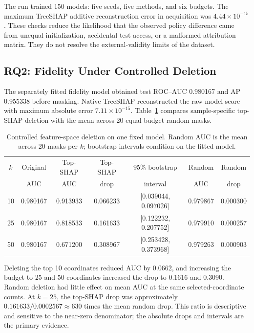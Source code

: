 The run trained 150 models: five seeds, five methods, and six budgets. The
maximum TreeSHAP additive reconstruction error in acquisition was
$4.44\times10^{-15}$. These checks reduce the likelihood that the observed
policy difference came from unequal initialization, accidental test access, or a
malformed attribution matrix. They do not resolve the external-validity limits of
the dataset.

\subsection{RQ2: Fidelity Under Controlled Deletion}

The separately fitted fidelity model obtained test ROC--AUC 0.980167 and AP
0.955338 before masking. Native TreeSHAP reconstructed the raw model score with
maximum absolute error $7.11\times10^{-15}$. Table~\ref{tab:fidelity} compares
sample-specific top-SHAP deletion with the mean across 20 equal-budget random
masks.

\begin{table}[t]
\centering
\caption{Controlled feature-space deletion on one fixed model. Random AUC is the mean across 20 masks per $k$; bootstrap intervals condition on the fitted model.}
\label{tab:fidelity}
\scriptsize
\setlength{\tabcolsep}{3pt}
\begin{tabular}{ccccccc}
\toprule
$k$ & Original & Top-SHAP & Top-SHAP & 95\% bootstrap & Random & Random \\
 & AUC & AUC & drop & interval & AUC & drop \\
\midrule
10 & 0.980167 & 0.913933 & 0.066233 & [0.039044, 0.097026] & 0.979867 & 0.000300 \\
25 & 0.980167 & 0.818533 & 0.161633 & [0.122232, 0.207752] & 0.979910 & 0.000257 \\
50 & 0.980167 & 0.671200 & 0.308967 & [0.253428, 0.373968] & 0.979263 & 0.000903 \\
\bottomrule
\end{tabular}
\end{table}

Deleting the top 10 coordinates reduced AUC by 0.0662, and increasing the budget
to 25 and 50 coordinates increased the drop to 0.1616 and 0.3090. Random deletion
had little effect on mean AUC at the same selected-coordinate counts. At $k=25$,
the top-SHAP drop was approximately $0.161633/0.0002567\approx630$ times the
mean random drop. This ratio is descriptive and sensitive to the near-zero
denominator; the absolute drops and intervals are the primary evidence.

